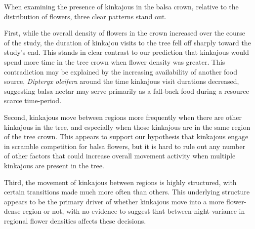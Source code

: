 \documentclass[twoside,12pt,final]{ucthesis-CA2012}
\begin{document}
\begin{ucmainmatter}
When examining the presence of kinkajous in the balsa crown, relative to the distribution of flowers, three clear patterns stand out.

First, while the overall density of flowers in the crown increased over the course of the study, the duration of kinkajou visits to the tree fell off sharply toward the study's end. This stands in clear contrast to our prediction that kinkajous would spend more time in the tree crown when flower density was greater. This contradiction may be explained by the increasing availability of another food source, \emph{Dipteryx oleifera} around the time kinkajous visit durations decreased, suggesting balsa nectar may serve primarily as a fall-back food during a resource scarce time-period.

Second, kinkajous move between regions more frequently when there are other kinkajous in the tree, and especially when those kinkajous are in the same region of the tree crown. This appears to support our hypothesis that kinkajous engage in scramble competition for balsa flowers, but it is hard to rule out any number of other factors that could increase overall movement activity when multiple kinkajous are present in the tree.

Third, the movement of kinkajous between regions is highly structured, with certain transitions made much more often than others. This underlying structure appears to be the primary driver of whether kinkajous move into a more flower-dense region or not, with no evidence to suggest that between-night variance in regional flower densities affects these decisions.


\end{ucmainmatter}
\end{document}
